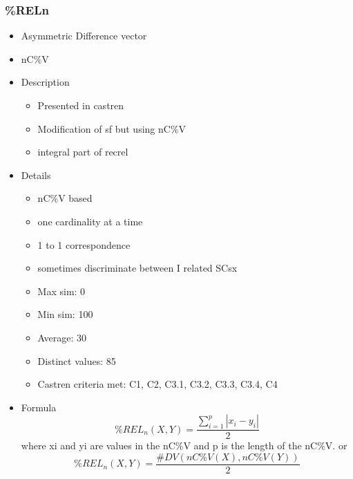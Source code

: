 \documentclass{article}
\begin{document}
\subsubsection{\%RELn}
\label{sec-6-8-1}
\begin{itemize}

\item Asymmetric Difference vector
\label{sec-6-8-1-1}%

\item nC\%V
\label{sec-6-8-1-2}%

\item Description
\label{sec-6-8-1-3}%
\begin{itemize}
\item Presented in castren
\item Modification of sf but using nC\%V
\item integral part of recrel
\end{itemize}

\item Details
\label{sec-6-8-1-4}%
\begin{itemize}
\item nC\%V based
\item one cardinality at a time
\item 1 to 1 correspondence
\item sometimes discriminate between I related SCsx
\item Max sim: 0
\item Min sim: 100
\item Average: 30
\item Distinct values: 85
\item Castren criteria met: C1, C2, C3.1, C3.2, C3.3, C3.4, C4
\end{itemize}

\item Formula\\
\label{sec-6-8-1-5}%
$$ \%REL_n(X,Y)=\frac{\sum_{i=1}^{p}|x_i-y_i|}{2} $$
where xi and yi are values in the nC\%V and p is the length of the nC\%V.
or
$$ \%REL_{n}\left(X,Y\right)=\frac{\#DV\left(nC\%V(X),nC\%V(Y)\right)}{2} $$
\end{itemize} %
\end{document}
